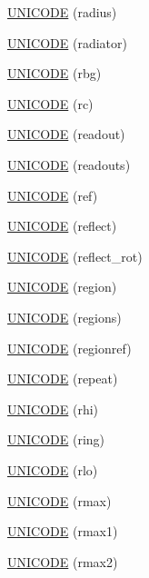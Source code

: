 \begin{DoxyCompactItemize}
\item 
\hyperlink{namespace_d_d4hep_1_1_x_m_l_aadc146cc8b286df3373da058a19ff786}{UNICODE} (radius)
\item 
\hyperlink{namespace_d_d4hep_1_1_x_m_l_ada35e3ded11c4999083712dac1905624}{UNICODE} (radiator)
\item 
\hyperlink{namespace_d_d4hep_1_1_x_m_l_a8ced02ee2c8a9dc9616cf731b0676171}{UNICODE} (rbg)
\item 
\hyperlink{namespace_d_d4hep_1_1_x_m_l_a92d22480b19d7705a660c0b1b22f8c18}{UNICODE} (rc)
\item 
\hyperlink{namespace_d_d4hep_1_1_x_m_l_afc57cf9bc4aff1b1a5102c496a605abf}{UNICODE} (readout)
\item 
\hyperlink{namespace_d_d4hep_1_1_x_m_l_ab91949ab80f09b7c3380bb7cbfd501c3}{UNICODE} (readouts)
\item 
\hyperlink{namespace_d_d4hep_1_1_x_m_l_a74bd75de00177939b861db7be1907fa1}{UNICODE} (ref)
\item 
\hyperlink{namespace_d_d4hep_1_1_x_m_l_ade41dd1e835fe39c520cdad69135380b}{UNICODE} (reflect)
\item 
\hyperlink{namespace_d_d4hep_1_1_x_m_l_a5bec99f595a694e2b387971ba02cfa4f}{UNICODE} (reflect\_\-rot)
\item 
\hyperlink{namespace_d_d4hep_1_1_x_m_l_ab56a033b5ccf7ae0564ba48af29a4437}{UNICODE} (region)
\item 
\hyperlink{namespace_d_d4hep_1_1_x_m_l_abc3dc713971498b5915e8cf3ffb520e9}{UNICODE} (regions)
\item 
\hyperlink{namespace_d_d4hep_1_1_x_m_l_a372e56ea2f058a5ce07b2e99b25f45a3}{UNICODE} (regionref)
\item 
\hyperlink{namespace_d_d4hep_1_1_x_m_l_a3e129ac4c9aba7038eae558b1970d3c9}{UNICODE} (repeat)
\item 
\hyperlink{namespace_d_d4hep_1_1_x_m_l_a5f9a0389ef1408a6f121b96d4aeb2e07}{UNICODE} (rhi)
\item 
\hyperlink{namespace_d_d4hep_1_1_x_m_l_a78b0ed06c29a49f8af568b54880ee2c4}{UNICODE} (ring)
\item 
\hyperlink{namespace_d_d4hep_1_1_x_m_l_a0da0949201069230cc25bbe49679731f}{UNICODE} (rlo)
\item 
\hyperlink{namespace_d_d4hep_1_1_x_m_l_ae875b1a18d2f7956471b2d7f80f9b26d}{UNICODE} (rmax)
\item 
\hyperlink{namespace_d_d4hep_1_1_x_m_l_a1e435d895e1b5eab76b63a12415d4813}{UNICODE} (rmax1)
\item 
\hyperlink{namespace_d_d4hep_1_1_x_m_l_a747ae66001d3b1e6c42f5091a2a4e73c}{UNICODE} (rmax2)

\end{DoxyCompactItemize}
